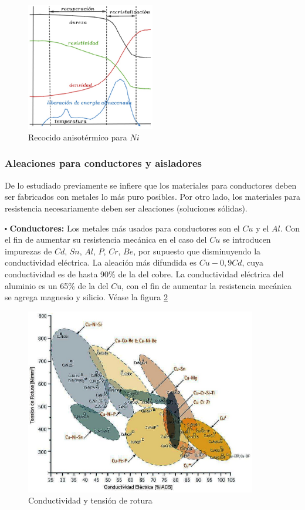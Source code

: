 \begin{figure}[H]
    \centering
    \includegraphics[width=0.5\textwidth]{./Figures/fig43}
	\caption{Recocido anisotérmico para $Ni$}
	\label{fig:44}
\end{figure}


\subsubsection{Aleaciones para conductores y aisladores}

De lo estudiado previamente se infiere que los materiales para conductores deben ser fabricados con metales lo más puro posibles. Por otro lado, los materiales para resistencia necesariamente deben ser aleaciones (soluciones sólidas).

$\centerdot$ \textbf{Conductores:}
Los metales más usados para conductores son el $Cu$ y el $Al$. Con el fin de aumentar su resistencia mecánica en el caso del $Cu$ se introducen impurezas de $Cd$, $Sn$, $Al$, $P$, $Cr$, $Be$, por supuesto que disminuyendo la conductividad eléctrica. La aleación más difundida es $Cu-0,9Cd$, cuya conductividad es de hasta 90\% de la del cobre. La conductividad eléctrica del aluminio es un 65\% de la del $C$u, con el fin de aumentar la resistencia mecánica se agrega magnesio y silicio. Véase la figura \ref{fig:46}

\begin{figure}[H]
    \centering
    \includegraphics[width=0.9\textwidth]{./Figures/fig46}
	\caption{Conductividad y tensión de rotura}
	\label{fig:46}
\end{figure}

